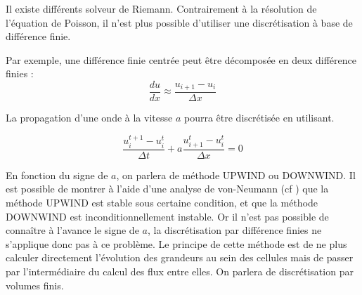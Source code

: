 Il existe différents solveur de Riemann.
Contrairement à la résolution de l’équation de Poisson, il n'est plus possible d'utiliser une discrétisation à base de différence finie.

Par exemple, une différence finie centrée peut être décomposée en deux différence finies : 
\begin{equation}
\frac{d u}{dx} \approx \frac{u_{i+1}  - u_i}{\Delta x} 
\end{equation}

La propagation d'une onde à la vitesse $a$ pourra être discrétisée en utilisant.

\begin{equation}
\frac{u_i^{t+1} - u_i^t }{\Delta t}   +a \frac{u_{i+1}^t  - u_i^t}{\Delta x} = 0
\end{equation}

En fonction du signe de $a$, on parlera de méthode UPWIND ou DOWNWIND.
Il est possible de montrer à l'aide d'une analyse de von-Neumann (cf \cite{toro1999riemann}) que la méthode UPWIND est stable sous certaine condition, et que la méthode DOWNWIND est inconditionnellement instable.
Or il n'est pas possible de connaître à l'avance le signe de $a$, la discrétisation par différence finies ne s'applique donc pas à ce problème. 
Le principe de cette méthode est de ne plus calculer directement l'évolution des grandeurs au sein des cellules mais de passer par l'intermédiaire du calcul des flux entre elles.
On parlera de discrétisation par volumes finis.



